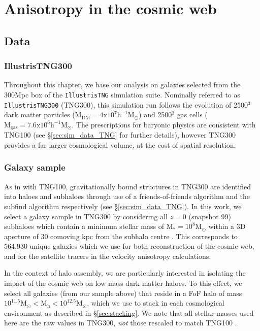 \section{Anisotropy in the cosmic web} \label{sec:dyn_mod_aniso}
\subsection{Data}
\subsubsection{IllustrisTNG300}
Throughout this chapter, we base our analysis on galaxies selected from the 300Mpc box of the \texttt{IllustrisTNG} simulation suite. Nominally referred to as \texttt{IllustrisTNG300} (TNG300), this simulation run follows the evolution of 2500$^3$ dark matter particles ($\mathrm{M_{DM} = 4 x 10^{7}h^{-1}M_{\odot}}$) and 2500$^3$ gas cells ($\mathrm{M_{gas} = 7.6 x 10^{6}h^{-1}M_{\odot}}$. The prescriptions for baryonic physics are consistent with TNG100 (see \S\ref{sec:sim_data_TNG} for further details), however TNG300 provides a far larger cosmological volume, at the cost of spatial resolution.

\subsubsection{Galaxy sample} \label{sec:gal_samp}
As in with TNG100, gravitationally bound structures in TNG300 are identified into haloes and subhaloes through use of a friends-of-friends algorithm \citep{davis85} and the subfind algorithm \citep{springel01} respectively (see \S\ref{sec:sim_data_TNG}). In this work, we select a galaxy sample in TNG300 by considering all $z=0$ (snapshot 99) subhaloes which contain a minimum stellar mass of $\mathrm{M_{\ast} = 10^{8} M_{\odot}}$ within a 3D aperture of 30 comoving kpc from the subhalo centre \citep[as defined in;][]{pillepich18b}. This corresponds to 564,930 unique galaxies which we use for both reconstruction of the cosmic web, and for the satellite tracers in the velocity anisotropy calculations.

In the context of halo assembly, we are particularly interested in isolating the impact of the cosmic web on low mass dark matter haloes. To this effect, we select all galaxies (from our sample above) that reside in a FoF halo of mass $\mathrm{10^{11.5} M_{\odot} < M_{h} < 10^{12.5} M_{\odot}}$, which we use to stack in each cosmological environment as described in \S\ref{sec:stacking}. We note that all stellar masses used here are the raw values in TNG300, \textit{not} those rescaled to match TNG100 \citep[see;][for more information]{engler2020}.

